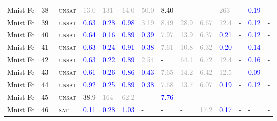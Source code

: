 \begin{center}
{\begin{longtable}{@{}llllllllllllll@{}}
Mnist Fc & 38 & ~\textsc{unsat} & \textcolor{darkgray}{13.0} & \textcolor{darkgray}{131} & \textcolor{darkgray}{14.0} & \textcolor{darkgray}{50.0} & \textcolor{second}{8.40} & - & - & \textcolor{darkgray}{263} & - & \textcolor{blue}{0.19} & - \\
Mnist Fc & 39 & ~\textsc{unsat} & \textcolor{blue}{0.63} & \textcolor{blue}{0.28} & \textcolor{blue}{0.98} & \textcolor{darkgray}{3.19} & \textcolor{darkgray}{8.49} & \textcolor{darkgray}{28.9} & \textcolor{darkgray}{6.67} & \textcolor{darkgray}{12.4} & - & \textcolor{blue}{0.12} & - \\
Mnist Fc & 40 & ~\textsc{unsat} & \textcolor{blue}{0.64} & \textcolor{blue}{0.16} & \textcolor{blue}{0.89} & \textcolor{blue}{0.39} & \textcolor{darkgray}{7.97} & \textcolor{darkgray}{13.9} & \textcolor{darkgray}{6.37} & \textcolor{blue}{0.21} & - & \textcolor{blue}{0.12} & - \\
Mnist Fc & 41 & ~\textsc{unsat} & \textcolor{blue}{0.63} & \textcolor{blue}{0.24} & \textcolor{blue}{0.91} & \textcolor{blue}{0.38} & \textcolor{darkgray}{7.61} & \textcolor{darkgray}{10.8} & \textcolor{darkgray}{6.32} & \textcolor{blue}{0.20} & - & \textcolor{blue}{0.14} & - \\
Mnist Fc & 42 & ~\textsc{unsat} & \textcolor{blue}{0.63} & \textcolor{blue}{0.22} & \textcolor{blue}{0.89} & \textcolor{darkgray}{2.54} & - & \textcolor{darkgray}{64.1} & \textcolor{darkgray}{6.72} & \textcolor{darkgray}{12.4} & - & \textcolor{blue}{0.16} & - \\
Mnist Fc & 43 & ~\textsc{unsat} & \textcolor{blue}{0.61} & \textcolor{blue}{0.26} & \textcolor{blue}{0.86} & \textcolor{blue}{0.43} & \textcolor{darkgray}{7.65} & \textcolor{darkgray}{14.2} & \textcolor{darkgray}{6.42} & \textcolor{darkgray}{12.5} & - & \textcolor{blue}{0.09} & - \\
Mnist Fc & 44 & ~\textsc{unsat} & \textcolor{blue}{0.92} & \textcolor{blue}{0.25} & \textcolor{blue}{0.89} & \textcolor{blue}{0.38} & \textcolor{darkgray}{7.68} & \textcolor{darkgray}{13.7} & \textcolor{darkgray}{6.07} & \textcolor{blue}{0.19} & - & \textcolor{blue}{0.12} & - \\
Mnist Fc & 45 & ~\textsc{unsat} & \textcolor{second}{38.9} & \textcolor{darkgray}{164} & \textcolor{darkgray}{62.2} & - & \textcolor{blue}{7.76} & - & - & - & - & - & - \\
Mnist Fc & 46 & ~\textsc{sat} & \textcolor{blue}{0.11} & \textcolor{blue}{0.28} & \textcolor{blue}{1.03} & - & - & - & \textcolor{darkgray}{17.2} & \textcolor{blue}{0.17} & - & - & - \\

\end{longtable}}
\end{center}
